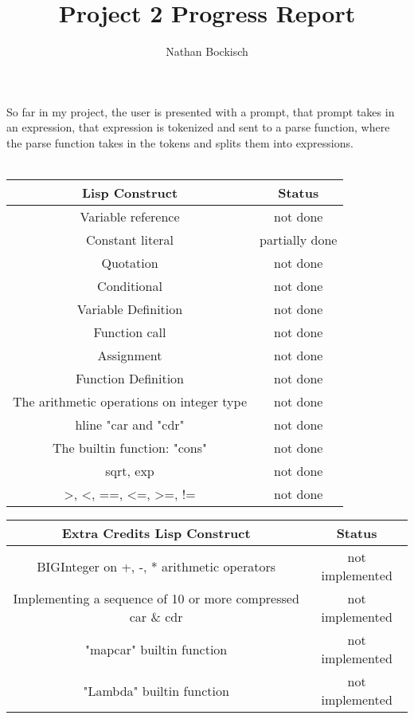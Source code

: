\documentclass{article}
\title{Project 2 Progress Report}
\author{Nathan Bockisch}
\begin{document}
\maketitle
So far in my project, the user is presented with a prompt, that prompt takes in an expression, that expression is tokenized and sent to a parse function, where
the parse function takes in the tokens and splits them into expressions.
\\ \\
\begin{center}
\begin{tabular}{| c | c |}
        \hline
        Lisp Construct & Status \\ \hline
        Variable reference & not done \\ \hline
        Constant literal & partially done \\ \hline
        Quotation & not done \\ \hline
        Conditional & not done \\ \hline
        Variable Definition & not done \\ \hline
        Function call & not done \\ \hline
        Assignment & not done \\ \hline
        Function Definition & not done \\ \hline
        The arithmetic operations on integer type & not done \\ hline
        "car and "cdr" & not done \\ \hline
        The built\-in function: "cons" & not done \\ \hline
        sqrt, exp & not done \\ \hline
        >, <, ==, <=, >=, != & not done \\ \hline
\end{tabular}
\newline
\vspace{3mm}
\newline
\begin{tabular}{| c | c |}
        \hline
        Extra Credits Lisp Construct & Status \\ \hline
        BIG\-Integer on +, -, * arithmetic operators & not implemented \\ \hline
        Implementing a sequence of 10 or more compressed car \& cdr & not implemented \\ \hline
        "mapcar" built\-in function & not implemented \\ \hline
        "Lambda" built\-in function & not implemented \\ \hline
\end{tabular}
\end{center}
\end{document}
